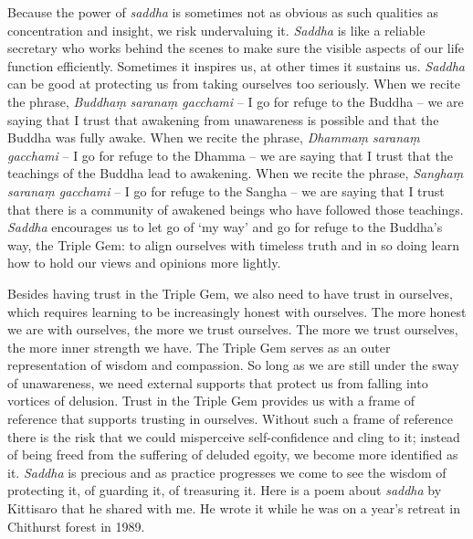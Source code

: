 Because the power of \emph{saddha} is sometimes not as obvious as such
qualities as concentration and insight, we risk undervaluing it.
\emph{Saddha} is like a reliable secretary who works behind the scenes to
make sure the visible aspects of our life function efficiently.
Sometimes it inspires us, at other times it sustains us. \emph{Saddha} can be
good at protecting us from taking ourselves too seriously. When we
recite the phrase, \emph{Buddhaṃ} \emph{saranaṃ gacchami} -- I go for refuge to the
Buddha -- we are saying that I trust that awakening from unawareness is
possible and that the Buddha was fully awake. When we recite the phrase,
\emph{Dhammaṃ saranaṃ gacchami} -- I go for refuge to the Dhamma -- we are
saying that I trust that the teachings of the Buddha lead to awakening.
When we recite the phrase, \emph{Sanghaṃ saranaṃ gacchami} -- I go for refuge
to the Sangha -- we are saying that I trust that there is a community of
awakened beings who have followed those teachings. \emph{Saddha} encourages
us to let go of `my way' and go for refuge to the Buddha's way, the
Triple Gem: to align ourselves with timeless truth and in so doing learn
how to hold our views and opinions more lightly.

Besides having trust in the Triple Gem, we also need to have trust in
ourselves, which requires learning to be increasingly honest with
ourselves. The more honest we are with ourselves, the more we trust
ourselves. The more we trust ourselves, the more inner strength we have.
The Triple Gem serves as an outer representation of wisdom and
compassion. So long as we are still under the sway of unawareness, we
need external supports that protect us from falling into vortices of
delusion. Trust in the Triple Gem provides us with a frame of reference
that supports trusting in ourselves. Without such a frame of reference
there is the risk that we could misperceive self-confidence and cling to
it; instead of being freed from the suffering of deluded egoity, we
become more identified as it. \emph{Saddha} is precious and as practice
progresses we come to see the wisdom of protecting it, of guarding it,
of treasuring it. Here is a poem about \emph{saddha} by Kittisaro that he
shared with me. He wrote it while he was on a year's retreat in
Chithurst forest in 1989.

